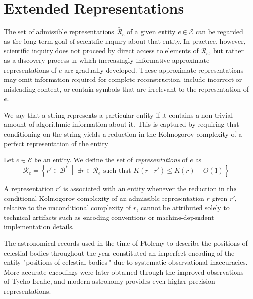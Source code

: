 %
% 

\section{Extended Representations}

The set of admissible representations $\bar{\mathcal{R}}_e$ of a given entity $e \in \mathcal{E}$ can be regarded as the long-term goal of scientific inquiry about that entity. In practice, however, scientific inquiry does not proceed by direct access to elements of $\bar{\mathcal{R}}_e$, but rather as a discovery process in which increasingly informative approximate representations of $e$ are gradually developed. These approximate representations may omit information required for complete reconstruction, include incorrect or misleading content, or contain symbols that are irrelevant to the representation of $e$.

We say that a string represents a particular entity if it contains a non-trivial amount of algorithmic information about it. This is captured by requiring that conditioning on the string yields a reduction in the Kolmogorov complexity of a perfect representation of the entity.

\begin{definition}
\label{def:representations_of_entity}
Let $e \in \mathcal{E}$ be an entity. We define the set of \emph{representations} of $e$ as
\[
\mathcal{R}_e =
\left\{
r' \in \mathcal{B}^\ast \;\middle|\; \exists r \in \bar{\mathcal{R}}_e \text{ such that } K(r \mid r') \le K(r) - O(1)
\right\}
\]
\end{definition}

\noindent
A representation $r'$ is associated with an entity whenever the reduction in the conditional Kolmogorov complexity of an admissible representation $r$ given $r'$, relative to the unconditional complexity of $r$, cannot be attributed solely to technical artifacts such as encoding conventions or machine-dependent implementation details.

\begin{example}
The astronomical records used in the time of Ptolemy to describe the positions of celestial bodies throughout the year constituted an imperfect encoding of the entity "positions of celestial bodies," due to systematic observational inaccuracies. More accurate encodings were later obtained through the improved observations of Tycho Brahe, and modern astronomy provides even higher-precision representations.
\end{example}

